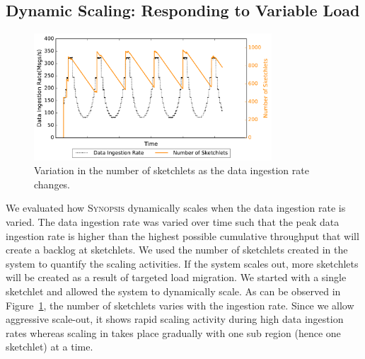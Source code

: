 \subsection{Dynamic Scaling: Responding to Variable Load}
\begin{figure}[b!]
    \centerline{\includegraphics[width=3.5in]{figures/dyn-scaling.pdf}}
    \caption{Variation in the number of sketchlets as the data ingestion rate changes.}
    \label{fig:dyn-scaling}
\end{figure}
We evaluated how \textsc{Synopsis} dynamically scales when the data ingestion rate is varied.
The data ingestion rate was varied over time such that the peak data ingestion rate is higher than the highest possible cumulative throughput that will create a backlog at sketchlets.
We used the number of sketchlets created in the system to quantify the scaling activities.
If the system scales out, more sketchlets will be created as a result of targeted load migration.
We started with a single sketchlet and allowed the system to dynamically scale.
As can be observed in Figure~\ref{fig:dyn-scaling}, the number of sketchlets varies with the ingestion rate.
Since we allow aggressive scale-out, it shows rapid scaling activity during high data ingestion rates whereas scaling in takes place gradually with one sub region (hence one sketchlet) at a time.

